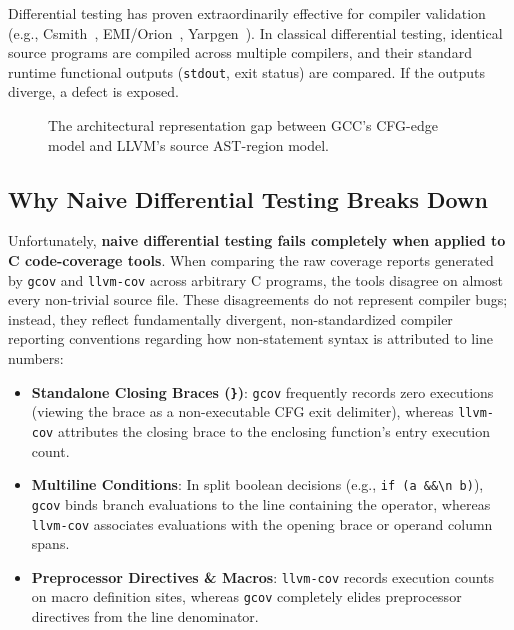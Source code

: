 \documentclass[sigconf,review,anonymous=false]{acmart}
\theoremstyle{definition}
\begin{document}
Differential testing has proven extraordinarily effective for compiler validation (e.g., Csmith~\cite{yang2011finding}, EMI/Orion~\cite{le2014compiler}, Yarpgen~\cite{livinskii2020random}). In classical differential testing, identical source programs are compiled across multiple compilers, and their standard runtime functional outputs (\texttt{stdout}, exit status) are compared. If the outputs diverge, a defect is exposed.

\begin{figure}[t]
\centering
{}
\caption{The architectural representation gap between GCC's CFG-edge model and LLVM's source AST-region model.}
\label{fig:pipeline_gap}
\end{figure}

\subsection{Why Naive Differential Testing Breaks Down}
Unfortunately, \textbf{naive differential testing fails completely when applied to C code-coverage tools}. When comparing the raw coverage reports generated by \texttt{gcov} and \texttt{llvm-cov} across arbitrary C programs, the tools disagree on almost every non-trivial source file. These disagreements do not represent compiler bugs; instead, they reflect fundamentally divergent, non-standardized compiler reporting conventions regarding how non-statement syntax is attributed to line numbers:
\begin{itemize}
    \item \textbf{Standalone Closing Braces (\texttt{\}})}: \texttt{gcov} frequently records zero executions (viewing the brace as a non-executable CFG exit delimiter), whereas \texttt{llvm-cov} attributes the closing brace to the enclosing function's entry execution count.
    \item \textbf{Multiline Conditions}: In split boolean decisions (e.g., \texttt{if (a \&\&\textbackslash n b)}), \texttt{gcov} binds branch evaluations to the line containing the operator, whereas \texttt{llvm-cov} associates evaluations with the opening brace or operand column spans.
    \item \textbf{Preprocessor Directives \& Macros}: \texttt{llvm-cov} records execution counts on macro definition sites, whereas \texttt{gcov} completely elides preprocessor directives from the line denominator.
\end{itemize}
\end{document}
